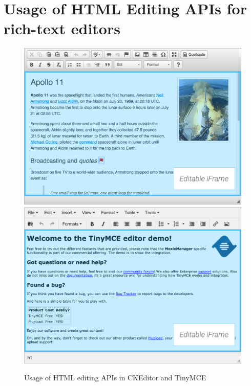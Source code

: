 


\section{Usage of HTML Editing APIs for rich-text editors}
\label{sec:useage-of-html-editing-apis}


\begin{figure}
\centering
  \includegraphics[width=.4\linewidth]{images/ckeditor-demo-overlayed.png}
  \includegraphics[width=.4\linewidth]{images/tinymce-demo-overlayed.png}
\caption{Usage of HTML editing APIs in CKEditor and TinyMCE}
\label{fig:usage_contenteditable_screenshots}
\end{figure}


